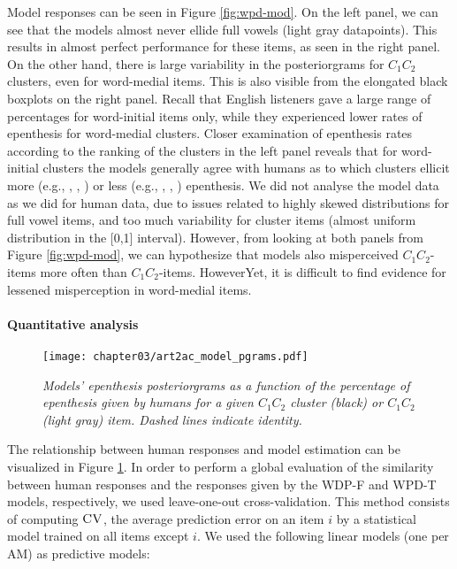 {  Model responses can be seen in Figure \ref{fig:wpd-mod}. On the left panel, we can see that the models almost never ellide full vowels (light gray datapoints). This results in almost perfect performance for these items, as seen in the right panel.
  On the other hand, there is large variability in the posteriorgrams for $C_{1}C_{2}$ clusters, even for word-medial items. This is also visible from the elongated black boxplots on the right panel. Recall that English listeners gave a large range of percentages for word-initial items only, while they experienced lower rates of epenthesis for word-medial clusters.
  Closer examination of epenthesis rates according to the ranking of the clusters in the left panel reveals that for word-initial clusters the models generally agree with humans as to which clusters ellicit more (e.g., , , ) or less (e.g., , , ) epenthesis.
  We did not analyse the model data as we did for human data, due to issues related to highly skewed distributions for full vowel items, and too much variability for cluster items (almost uniform distribution in the [0,1] interval). However, from looking at both panels from Figure \ref{fig:wpd-mod}, we can hypothesize that models also misperceived $C_{1}C_{2}$-items more often than $C_{1}$\textipa{[@]}$C_{2}$-items. HoweverYet, it is difficult to find evidence for lessened misperception in word-medial items.  

\paragraph{Quantitative analysis}

\begin{figure}[htb!]
    \centering
    \texttt{[image: chapter03/art2ac\_model\_pgrams.pdf]}
    \caption{\textit{Models' epenthesis posteriorgrams as a function of the percentage of epenthesis given by humans for a given $C_{1}C_{2}$ cluster (black) or $C_{1}$\textipa{[@]}$C_{2}$ (light gray) item. Dashed lines indicate identity.}}
    \label{fig:wpd-corr}
  \end{figure}

  The relationship between human responses and model estimation can be visualized in Figure \ref{fig:wpd-corr}. In order to perform a global evaluation of the similarity between human responses and the responses given by the WDP-F and WPD-T models, respectively, we used leave-one-out cross-validation. This method consists of computing $\textsc{CV}$, the average prediction error on an item $i$ by a statistical model trained on all items except $i$. We used the following linear models (one per AM) as predictive models:

}
